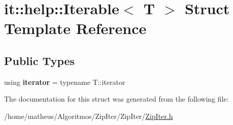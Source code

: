 \hypertarget{structit_1_1help_1_1Iterable}{}\section{it\+:\+:help\+:\+:Iterable$<$ T $>$ Struct Template Reference}
\label{structit_1_1help_1_1Iterable}
\subsection*{Public Types}
\begin{DoxyCompactItemize}
\item 
using {\bfseries iterator} = typename T\+::iterator\hypertarget{structit_1_1help_1_1Iterable_ae119f8a540d8b116afb5a0153c6f6c8a}{}\label{structit_1_1help_1_1Iterable_ae119f8a540d8b116afb5a0153c6f6c8a}

\end{DoxyCompactItemize}


The documentation for this struct was generated from the following file\+:\begin{DoxyCompactItemize}
\item 
/home/matheus/\+Algoritmos/\+Zip\+Iter/\+Zip\+Iter/\hyperlink{ZipIter_8h}{Zip\+Iter.\+h}\end{DoxyCompactItemize}
